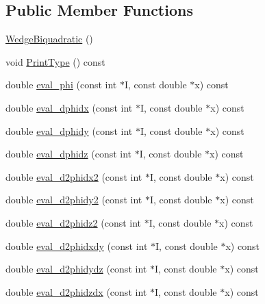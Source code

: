 \subsection*{Public Member Functions}
\begin{DoxyCompactItemize}
\item 
\mbox{\hyperlink{classfemus_1_1_wedge_biquadratic_aec9d06b18d81664df8667208abf1086c}{Wedge\+Biquadratic}} ()
\item 
void \mbox{\hyperlink{classfemus_1_1_wedge_biquadratic_a7152bbe7398026b63f46d67d7c947f89}{Print\+Type}} () const
\item 
double \mbox{\hyperlink{classfemus_1_1_wedge_biquadratic_ae552733ed0284e76d8cd13e3b9b02b7f}{eval\+\_\+phi}} (const int $\ast$I, const double $\ast$x) const
\item 
double \mbox{\hyperlink{classfemus_1_1_wedge_biquadratic_aaa7530531bf1306063e7082aaeb82c4f}{eval\+\_\+dphidx}} (const int $\ast$I, const double $\ast$x) const
\item 
double \mbox{\hyperlink{classfemus_1_1_wedge_biquadratic_aae739c976101ce3475bcef7ac9927b19}{eval\+\_\+dphidy}} (const int $\ast$I, const double $\ast$x) const
\item 
double \mbox{\hyperlink{classfemus_1_1_wedge_biquadratic_a1aa59bba6892b349afc89f427266e30b}{eval\+\_\+dphidz}} (const int $\ast$I, const double $\ast$x) const
\item 
double \mbox{\hyperlink{classfemus_1_1_wedge_biquadratic_aca900bdb24740b8bf69916067272445d}{eval\+\_\+d2phidx2}} (const int $\ast$I, const double $\ast$x) const
\item 
double \mbox{\hyperlink{classfemus_1_1_wedge_biquadratic_a76ec3516df27dd1e41d49fcbb652f750}{eval\+\_\+d2phidy2}} (const int $\ast$I, const double $\ast$x) const
\item 
double \mbox{\hyperlink{classfemus_1_1_wedge_biquadratic_abbcd4e11513f29e03873a65c911f4a13}{eval\+\_\+d2phidz2}} (const int $\ast$I, const double $\ast$x) const
\item 
double \mbox{\hyperlink{classfemus_1_1_wedge_biquadratic_a640cd05846eea041705474ab453cb062}{eval\+\_\+d2phidxdy}} (const int $\ast$I, const double $\ast$x) const
\item 
double \mbox{\hyperlink{classfemus_1_1_wedge_biquadratic_a56c62427ea3790f8500404d330b81439}{eval\+\_\+d2phidydz}} (const int $\ast$I, const double $\ast$x) const
\item 
double \mbox{\hyperlink{classfemus_1_1_wedge_biquadratic_a19df28dae2ec661641a107ae669f0f92}{eval\+\_\+d2phidzdx}} (const int $\ast$I, const double $\ast$x) const
\end{DoxyCompactItemize}
